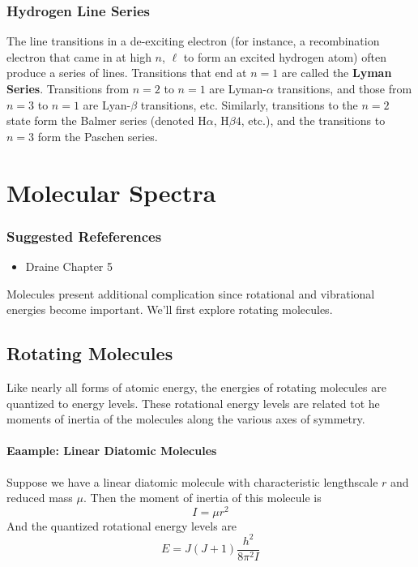 \documentclass[10pt]{article}
\numberwithin{equation}{section}
\begin{document}
\subsubsection{Hydrogen Line Series} %
\label{ssub:hydrogen_line_series}
The line transitions in a de-exciting electron (for instance, a recombination electron that came in at high $n$, $\ell$ to form an excited hydrogen atom) often produce a series of lines. Transitions that end at $n=1$ are called the \textbf{Lyman Series}. Transitions from $n=2$ to $n=1$ are Lyman-$\alpha$ transitions, and those from $n=3$ to $n=1$ are Lyan-$\beta$ transitions, etc. Similarly, transitions to the $n=2$ state form the Balmer series (denoted H$\alpha$, H$\beta4$, etc.), and the transitions to $n=3$ form the Paschen series.
\section{Molecular Spectra} %
\label{sec:molecular_spectra}
\subsubsection*{Suggested Refeferences} %
\label{ssub:suggested_refeferences}
\begin{itemize}
  \item Draine Chapter 5
\end{itemize}
Molecules present additional complication since rotational and vibrational
energies become important. We'll first explore rotating molecules.
\subsection{Rotating Molecules} %
\label{sub:rotating_molecules}
Like nearly all forms of atomic energy, the energies of rotating molecules are
quantized to energy levels. These rotational energy levels are related tot he
moments of inertia of the molecules along the various axes of symmetry.

\paragraph{Eaample: Linear Diatomic Molecules} %
\label{par:eaample_linear_diatomic_molecules}
Suppose we have a linear diatomic molecule with characteristic lengthscale $r$
and reduced mass $\mu$. Then the moment of inertia of this molecule is
\begin{equation}
  \label{eq:ldmol:1} I = \mu r^2
\end{equation}
And the quantized rotational energy levels are
\begin{equation}
  \label{eq:ldmol:2} E = J(J+1)\frac{h^2}{8\pi^2 I}
\end{equation}
\end{document}
